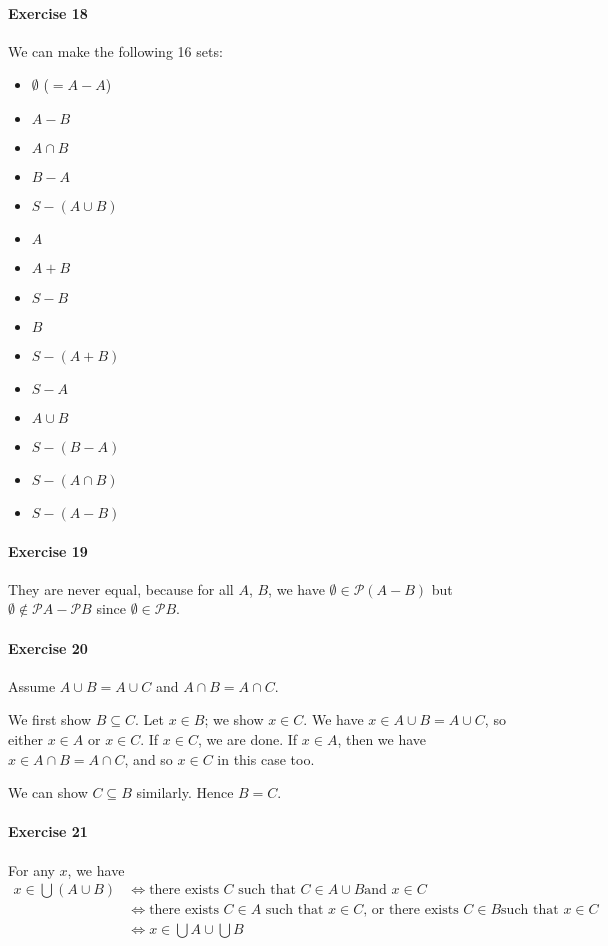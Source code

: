 \documentclass{report}
\begin{document}
    \paragraph{Exercise 18}
    We can make the following 16 sets:
    \begin{itemize}
        \item $\emptyset$ ($= A - A$)
        \item $A - B$
        \item $A \cap B$
        \item $B - A$
        \item $S - (A \cup B)$
        \item $A$
        \item $A + B$
        \item $S - B$
        \item $B$
        \item $S - (A + B)$
        \item $S - A$
        \item $A \cup B$
        \item $S - (B - A)$
        \item $S - (A \cap B)$
        \item $S - (A - B)$
    \end{itemize}

    \paragraph{Exercise 19}
    They are never equal, because for all $A$, $B$, we have $\emptyset \in \mathcal{P}(A - B)$ but
    $\emptyset \notin \mathcal{P} A - \mathcal{P} B$ since $\emptyset \in \mathcal{P} B$.

    \paragraph{Exercise 20}
    Assume $A \cup B = A \cup C$ and $A \cap B = A \cap C$.

    We first show $B \subseteq C$. Let $x \in B$; we show $x \in C$. We have $x \in A \cup B = A \cup C$, so either $x \in A$
    or $x \in C$. If $x \in C$, we are done. If $x \in A$, then we have $x \in A \cap B = A \cap C$,
    and so $x \in C$ in this case too.

    We can show $C \subseteq B$ similarly. Hence $B = C$.

    \paragraph{Exercise 21}
    For any $x$, we have
    \begin{align*}
        x \in \bigcup (A \cup B) & \Leftrightarrow \text{there exists $C$ such that $C \in A \cup B$
        and $x \in C$} \\
        & \Leftrightarrow \text{there exists $C \in A$ such that $x \in C$, or there exists $C \in B$
        such that $x \in C$} \\
        & \Leftrightarrow x\in \bigcup A \cup \bigcup B
    \end{align*}
\end{document}
